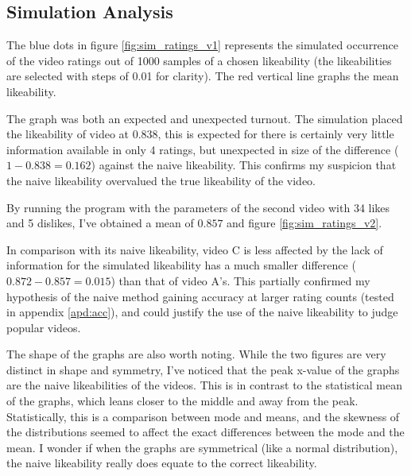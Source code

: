 \documentclass[a4paper,11pt]{article}
\begin{document}
\subsection{Simulation Analysis}
The blue dots in figure \ref{fig:sim_ratings_v1} represents the simulated occurrence of the video ratings out of 1000 samples of a chosen likeability (the likeabilities are selected with steps of 0.01 for clarity). The red vertical line graphs the mean likeability.

The graph was both an expected and unexpected turnout. The simulation placed the likeability of video at $0.838$, this is expected for there is certainly very little information available in only 4 ratings, but unexpected in size of the difference ($1-0.838=0.162$) against the naive likeability. This confirms my suspicion that the naive likeability overvalued the true likeability of the video.

By running the program with the parameters of the second video with 34 likes and 5 dislikes,
I've obtained a mean of $0.857$ and figure \ref{fig:sim_ratings_v2}.

In comparison with its naive likeability, video C is less affected by the lack of information for the simulated likeability has a much smaller difference ($0.872-0.857=0.015$) than that of video A's. This partially confirmed my hypothesis of the naive method gaining accuracy at larger rating counts (tested in appendix \ref{apd:acc}), and could justify the use of the naive likeability to judge popular videos.

The shape of the graphs are also worth noting.
While the two figures are very distinct in shape and symmetry, I've noticed that the peak x-value of the graphs are the naive likeabilities of the videos. This is in contrast to the statistical mean of the graphs, which leans closer to the middle and away from the peak. Statistically, this is a comparison between mode and means, and the skewness of the distributions seemed to affect the exact differences between the mode and the mean. I wonder if when the graphs are symmetrical (like a normal distribution), the naive likeability really does equate to the correct likeability.

\end{document}
